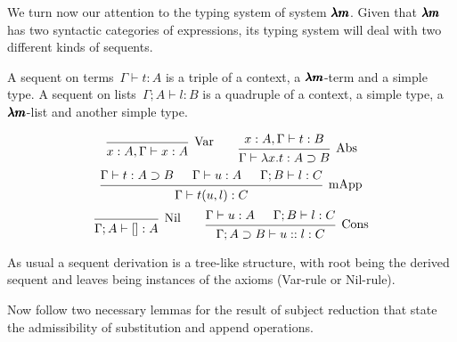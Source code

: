 
We turn now our attention to the typing system of system $\pmb{\lambda m}$.
Given that $\pmb{\lambda m}$ has two syntactic categories of expressions, its typing system will deal with two different kinds of sequents.

\begin{definition}[Sequent]
  A sequent on terms~$\Gamma \vdash t:A$ is a triple of a context, a $\pmb{\lambda m}$-term and a simple type.
  A sequent on lists~$\Gamma;A \vdash l:B$ is a quadruple of a context, a simple type, a $\pmb{\lambda m}$-list and another simple type.
\end{definition}


\begin{definition}
  \[
    \begin{prooftree}
      \infer0[Var]{ x:A, \Gamma \vdash x:A } 
    \end{prooftree}
    \qquad
    \begin{prooftree}
      \hypo{ x:A, \Gamma \vdash t:B }
      \infer1[Abs]{ \Gamma \vdash \lambda x . t : A \supset B  } 
    \end{prooftree}
  \]
  \[
    \begin{prooftree}
      \hypo{ \Gamma \vdash t : A \supset B }
      \hypo{ \Gamma \vdash u : A }
      \hypo{ \Gamma ; B \vdash l : C }	
      \infer3[mApp]{ \Gamma \vdash t(u, l) : C } 
    \end{prooftree}
  \]
  \[
    \begin{prooftree}
      \infer0[Nil]{ \Gamma ; A \vdash []:A } 
    \end{prooftree}
    \qquad
    \begin{prooftree}
      \hypo{ \Gamma \vdash u:A }
      \hypo{ \Gamma ; B \vdash l:C }
      \infer2[Cons]{ \Gamma ; A \supset B \vdash  u::l : C } 
    \end{prooftree}
  \]
\end{definition}

As usual a sequent derivation is a tree-like structure, with root being the derived sequent and leaves being instances of the axioms (Var-rule or Nil-rule).


Now follow two necessary lemmas for the result of subject reduction that state the admissibility of substitution and append operations.

